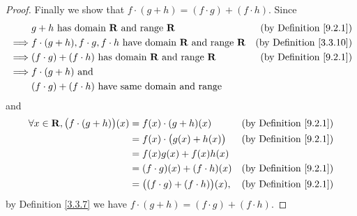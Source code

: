 \begin{proof}
    Finally we show that \(f \cdot (g + h) = (f \cdot g) + (f \cdot h)\).
    Since
    \begin{align*}
                 & g + h \text{ has domain } \mathbf{R} \text{ and range } \mathbf{R}                                   & \text{(by Definition \ref{9.2.1})}  \\
        \implies & f \cdot (g + h), f \cdot g, f \cdot h  \text{ have domain } \mathbf{R} \text{ and range } \mathbf{R} & \text{(by Definition \ref{3.3.10})} \\
        \implies & (f \cdot g) + (f \cdot h)  \text{ has domain } \mathbf{R} \text{ and range } \mathbf{R}              & \text{(by Definition \ref{9.2.1})}  \\
        \implies & f \cdot (g + h) \text{ and }                                                                                               \\
                 & (f \cdot g) + (f \cdot h) \text{ have same domain and range}
    \end{align*}
    and
    \begin{align*}
        \forall x \in \mathbf{R}, \big(f \cdot (g + h)\big)(x) & = f(x) \cdot (g + h)(x)                   & \text{(by Definition \ref{9.2.1})} \\
                                                       & = f(x) \cdot \big(g(x) + h(x)\big)        & \text{(by Definition \ref{9.2.1})} \\
                                                       & = f(x)g(x) + f(x)h(x)                                                          \\
                                                       & = (f \cdot g)(x) + (f \cdot h)(x)         & \text{(by Definition \ref{9.2.1})} \\
                                                       & = \big((f \cdot g) + (f \cdot h)\big)(x), & \text{(by Definition \ref{9.2.1})}
    \end{align*}
    by Definition \ref{3.3.7} we have \(f \cdot (g + h) = (f \cdot g) + (f \cdot h)\).
\end{proof}